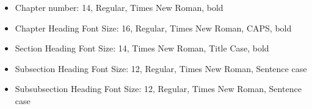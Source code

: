 \begin{itemize}
    \item Chapter number: 14, Regular, Times New Roman, bold
    \item Chapter Heading Font Size: 16, Regular, Times New Roman, CAPS, bold
    \item Section Heading Font Size: 14, Times New Roman, Title Case, bold
    \item Subsection Heading Font Size: 12, Regular, Times New Roman, Sentence case
    \item Subsubsection Heading Font Size: 12, Regular, Times New Roman, Sentence case
\end{itemize}